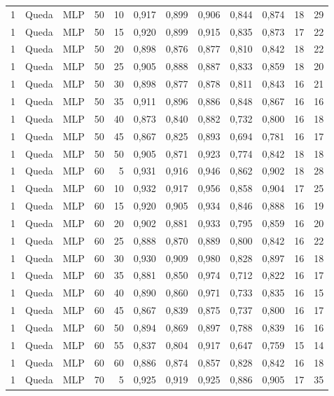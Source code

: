 \begin{longtable}{@{}rllrrrrrrrrr@{}}
1 & Queda & MLP & 50 & 10 & 0,917 & 0,899 & 0,906 & 0,844 & 0,874 & 18 & 29 \\
1 & Queda & MLP & 50 & 15 & 0,920 & 0,899 & 0,915 & 0,835 & 0,873 & 17 & 22 \\
1 & Queda & MLP & 50 & 20 & 0,898 & 0,876 & 0,877 & 0,810 & 0,842 & 18 & 22 \\
1 & Queda & MLP & 50 & 25 & 0,905 & 0,888 & 0,887 & 0,833 & 0,859 & 18 & 20 \\
1 & Queda & MLP & 50 & 30 & 0,898 & 0,877 & 0,878 & 0,811 & 0,843 & 16 & 21 \\
1 & Queda & MLP & 50 & 35 & 0,911 & 0,896 & 0,886 & 0,848 & 0,867 & 16 & 16 \\
1 & Queda & MLP & 50 & 40 & 0,873 & 0,840 & 0,882 & 0,732 & 0,800 & 16 & 18 \\
1 & Queda & MLP & 50 & 45 & 0,867 & 0,825 & 0,893 & 0,694 & 0,781 & 16 & 17 \\
1 & Queda & MLP & 50 & 50 & 0,905 & 0,871 & 0,923 & 0,774 & 0,842 & 18 & 18 \\
1 & Queda & MLP & 60 & 5 & 0,931 & 0,916 & 0,946 & 0,862 & 0,902 & 18 & 28 \\
1 & Queda & MLP & 60 & 10 & 0,932 & 0,917 & 0,956 & 0,858 & 0,904 & 17 & 25 \\
1 & Queda & MLP & 60 & 15 & 0,920 & 0,905 & 0,934 & 0,846 & 0,888 & 16 & 19 \\
1 & Queda & MLP & 60 & 20 & 0,902 & 0,881 & 0,933 & 0,795 & 0,859 & 16 & 20 \\
1 & Queda & MLP & 60 & 25 & 0,888 & 0,870 & 0,889 & 0,800 & 0,842 & 16 & 22 \\
1 & Queda & MLP & 60 & 30 & 0,930 & 0,909 & 0,980 & 0,828 & 0,897 & 16 & 18 \\
1 & Queda & MLP & 60 & 35 & 0,881 & 0,850 & 0,974 & 0,712 & 0,822 & 16 & 17 \\
1 & Queda & MLP & 60 & 40 & 0,890 & 0,860 & 0,971 & 0,733 & 0,835 & 16 & 15 \\
1 & Queda & MLP & 60 & 45 & 0,867 & 0,839 & 0,875 & 0,737 & 0,800 & 16 & 17 \\
1 & Queda & MLP & 60 & 50 & 0,894 & 0,869 & 0,897 & 0,788 & 0,839 & 16 & 16 \\
1 & Queda & MLP & 60 & 55 & 0,837 & 0,804 & 0,917 & 0,647 & 0,759 & 15 & 14 \\
1 & Queda & MLP & 60 & 60 & 0,886 & 0,874 & 0,857 & 0,828 & 0,842 & 16 & 18 \\
1 & Queda & MLP & 70 & 5 & 0,925 & 0,919 & 0,925 & 0,886 & 0,905 & 17 & 35 \\

\end{longtable}

